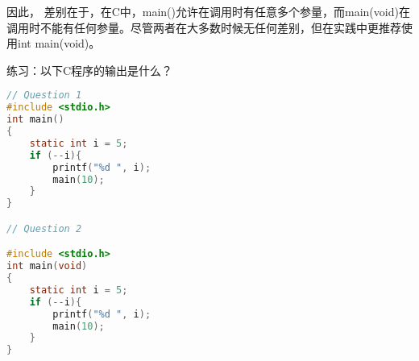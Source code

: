 \documentclass[10pt,a4paper%
tablecaptionabove]{article}
\begin{document}
\begin{CJK}{UTF8}{gkai}
因此， 差别在于，在C中，main()允许在调用时有任意多个参量，而main(void)在调用时不能有任何参量。尽管两者在大多数时候无任何差别，但在实践中更推荐使用int main(void)。

练习：以下C程序的输出是什么？
\begin{lstlisting}[language=c,frame=single]
// Question 1
#include <stdio.h>
int main()
{
    static int i = 5;
    if (--i){
        printf("%d ", i);
        main(10);
    }
}

// Question 2

#include <stdio.h>
int main(void)
{
    static int i = 5;
    if (--i){
        printf("%d ", i);
        main(10);
    }
}
\end{lstlisting}
\end{CJK}
\end{document}
